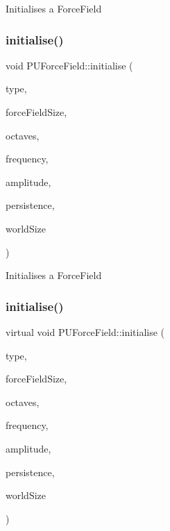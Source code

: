 Initialises a Force\+Field \mbox{\label{classPUForceField_a86c5e8c03d61ec27c5bedaa0c19d0092}} 
\subsubsection{\texorpdfstring{initialise()}{initialise()}\hspace{0.1cm}{\footnotesize\ttfamily [3/4]}}
{\footnotesize\ttfamily void P\+U\+Force\+Field\+::initialise (\begin{DoxyParamCaption}\item[{Force\+Field\+Type}]{type,  }\item[{unsigned int}]{force\+Field\+Size,  }\item[{unsigned short}]{octaves,  }\item[{double}]{frequency,  }\item[{double}]{amplitude,  }\item[{double}]{persistence,  }\item[{const \hyperlink{classVec3}{Vec3} \&}]{world\+Size }\end{DoxyParamCaption})\hspace{0.3cm}{\ttfamily [virtual]}}

Initialises a Force\+Field \mbox{\label{classPUForceField_af295323d9a536013ff1d945ceb282739}} 
\subsubsection{\texorpdfstring{initialise()}{initialise()}\hspace{0.1cm}{\footnotesize\ttfamily [4/4]}}
{\footnotesize\ttfamily virtual void P\+U\+Force\+Field\+::initialise (\begin{DoxyParamCaption}\item[{Force\+Field\+Type}]{type,  }\item[{unsigned int}]{force\+Field\+Size,  }\item[{unsigned short}]{octaves,  }\item[{double}]{frequency,  }\item[{double}]{amplitude,  }\item[{double}]{persistence,  }\item[{const \hyperlink{classVec3}{Vec3} \&}]{world\+Size }\end{DoxyParamCaption})\hspace{0.3cm}{\ttfamily [virtual]}}

